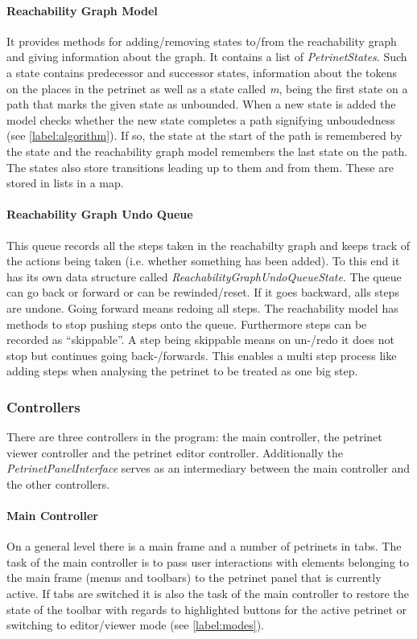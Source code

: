 \documentclass[10pt, a4paper]{article}
\begin{document}
\paragraph{Reachability Graph Model} It provides methods for adding/removing states to/from the reachability graph and giving information about the graph. It contains a list of \textit{PetrinetStates}. Such a state contains predecessor and successor states, information about the tokens on the places in the petrinet as well as a state called \textit{m}, being the first state on a path that marks the given state as unbounded. When a new state is added the model checks whether the new state completes a path signifying unboudedness (see \ref{label:algorithm}). If so, the state at the start of the path is remembered by the state and the reachability graph model remembers the last state on the path. The states also store transitions leading up to them and from them. These are stored in lists in a map.
\paragraph{Reachability Graph Undo Queue} This queue records all the steps taken in the reachabilty graph and keeps track of the actions being taken (i.e. whether something has been added). To this end it has its own data structure called \textit{ReachabilityGraphUndoQueueState}. The queue can go back or forward or can be rewinded/reset. If it goes backward, alls steps are undone. Going forward means redoing all steps. The reachability model has methods to stop pushing steps onto the queue. Furthermore steps can be recorded as \enquote{skippable}. A step being skippable means on un-/redo it does not stop but continues going back-/forwards. This enables a multi step process like adding steps when analysing the petrinet to be treated as one big step.  

\subsubsection{Controllers}
There are three controllers in the program: the main controller, the petrinet viewer controller and the petrinet editor controller. Additionally the \textit{PetrinetPanelInterface} serves as an intermediary between the main controller and the other controllers.

\paragraph{Main Controller} On a general level there is a main frame and a number of petrinets in tabs. The task of the main controller is to pass user interactions with elements belonging to the main frame (menus and toolbars) to the petrinet panel that is currently active. If tabs are switched it is also the task of the main controller to restore the state of the toolbar with regards to highlighted buttons for the active petrinet or switching to editor/viewer mode (see \ref{label:modes}). 
\end{document}
